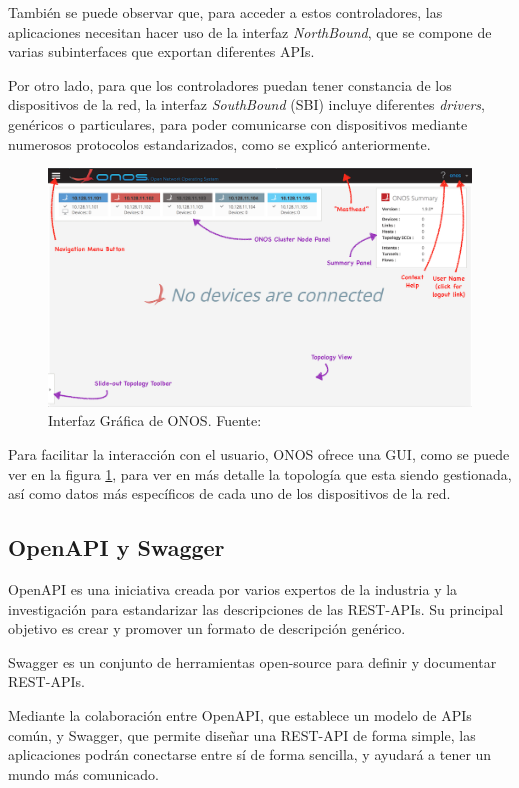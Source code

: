 También se puede observar que, para acceder a estos controladores, las aplicaciones necesitan hacer uso de la interfaz \textit{NorthBound}, que se compone de varias subinterfaces que exportan diferentes \acp{API}.

Por otro lado, para que los controladores puedan tener constancia de los dispositivos de la red, la interfaz \textit{SouthBound} (\ac{SBI}) incluye diferentes \textit{drivers}, genéricos o particulares, para poder comunicarse con dispositivos mediante numerosos protocolos estandarizados, como se explicó anteriormente.

\begin{figure}[!ht]
	\centering
	\includegraphics[width=0.8\linewidth]{imagenes/onos_gui}
	\caption{Interfaz Gráfica de ONOS. 
		Fuente: \cite{wikionosbib}}
	\label{fig:onosgui}
\end{figure}

Para facilitar la interacción con el usuario, \ac{ONOS} ofrece una \ac{GUI}, como se puede ver en la figura \ref{fig:onosgui}, para ver en más detalle la topología que esta siendo gestionada, así como datos más específicos de cada uno de los dispositivos de la red. 


\subsection{OpenAPI y Swagger}
\label{subsec:openapi}

OpenAPI\cite{openapibib} es una iniciativa creada por varios expertos de la industria y la investigación para estandarizar las descripciones de las \ac{REST}-\acp{API}. Su principal objetivo es crear y promover un formato de descripción genérico.

Swagger\cite{swaggerbib} es un conjunto de herramientas open-source para definir y documentar \ac{REST}-\acp{API}.

Mediante la colaboración entre OpenAPI, que establece un modelo de \acp{API} común, y Swagger, que permite diseñar una \ac{REST}-\ac{API} de forma simple, las aplicaciones podrán conectarse entre sí de forma sencilla, y ayudará a tener un mundo más comunicado.

